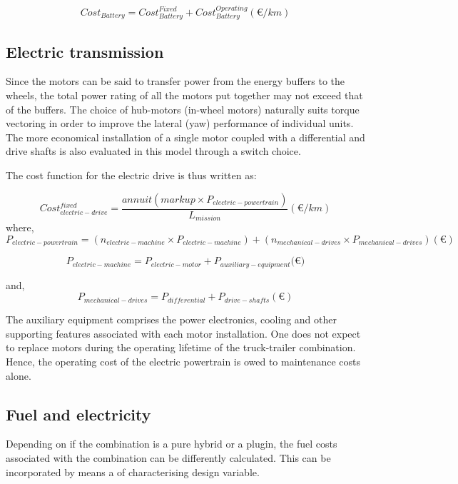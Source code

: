 \documentclass[ExampleMasters.tex]{subfiles}
\begin{document}
			\begin{equation}
				Cost_{Battery} = Cost_{Battery}^{Fixed} + Cost_{Battery}^{Operating} (\euro{}/km)
			\end{equation}

		\subsection{Electric transmission}

			Since the motors can be said to transfer power from the energy buffers to the wheels, the total power rating of all the motors put together may not exceed that of the buffers. The choice of hub-motors (in-wheel motors) naturally suits torque vectoring in order to improve the lateral (yaw) performance of individual units. The more economical installation of a single motor coupled with a differential and drive shafts is also evaluated in this model through a switch choice. 

			The cost function for the electric drive is thus written as:

			\begin{equation}
				Cost_{electric-drive}^{fixed} = \frac{annuit(markup \times P_{electric-powertrain})}{L_{mission}} (\euro{}/km)
			\end{equation}
			where,
			\begin{equation}
				P_{electric-powertrain} = (n_{electric-machine} \times P_{electric-machine}) + (n_{mechanical-drives} \times P_{mechanical-drives}) (\euro{})
			\end{equation}

			\begin{equation}
				P_{electric-machine} = P_{electric-motor}+P_{auxiliary-equipment} (\euro{)}
			\end{equation}

			and,
			\begin{equation}
				P_{mechanical-drives} = P_{differential}+P_{drive-shafts} (\euro{})
			\end{equation}

			The auxiliary equipment comprises the power electronics, cooling and other supporting features associated with each motor installation. One does not expect to replace motors during the operating lifetime of the truck-trailer combination. Hence, the operating cost of the electric powertrain is owed to maintenance costs alone.

		\subsection{Fuel and electricity}
			Depending on if the combination is a pure hybrid or a plugin, the fuel costs associated with the combination can be differently calculated. This can be incorporated by means a of characterising design variable.
\end{document}
